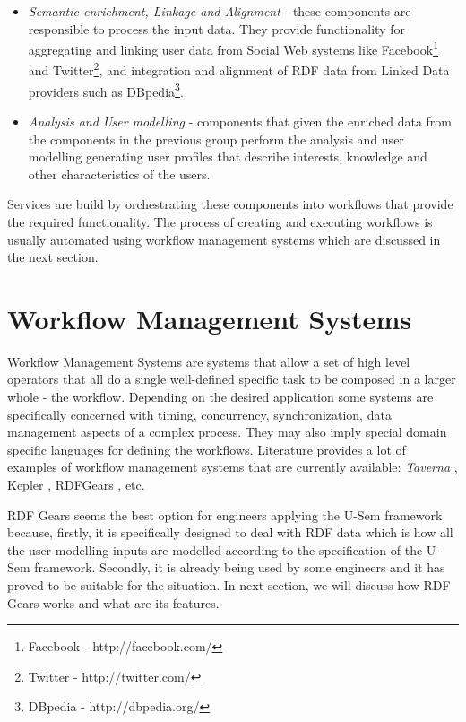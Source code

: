\begin{itemize}
	\item \textit{Semantic enrichment, Linkage and Alignment} - these components are responsible to process the input data. They provide functionality for aggregating and linking user data from Social Web systems like Facebook\footnote{Facebook - http://facebook.com/} and Twitter\footnote{Twitter - http://twitter.com/}, and integration and alignment of RDF data from Linked Data providers such as DBpedia\footnote{DBpedia - http://dbpedia.org/}.
	
	\item \textit{Analysis and User modelling} - components that given the enriched data from the components in the previous group perform the analysis and user modelling generating user profiles that describe interests, knowledge and other characteristics of the users.
\end{itemize}

Services are build by orchestrating these components into workflows that provide the required functionality. The process of creating and executing workflows is usually automated using workflow management systems which are discussed in the next section.

\section{Workflow Management Systems}
\label{sec:workfloManagement}

Workflow Management Systems are systems that allow a set of high level operators that all do a single well-defined specific task to be composed in a larger whole - the workflow. Depending on the desired application some systems are specifically concerned with  timing, concurrency, synchronization, data management aspects of a complex process. They may also imply special domain specific languages for defining the workflows. Literature provides a lot of examples of workflow management systems that are currently available: \textit{Taverna} \cite{hull2006taverna}, Kepler \cite{ludascher2006scientific}, RDFGears \cite{feliksik2011}, etc.

RDF Gears seems the best option for engineers applying the U-Sem framework because, firstly, it is specifically designed to deal with RDF data which is how all the user modelling inputs are modelled according to the specification of the U-Sem framework. Secondly, it is already being used by some engineers and it has proved to be suitable for the situation. In next section, we will discuss how RDF Gears works and what are its features.

